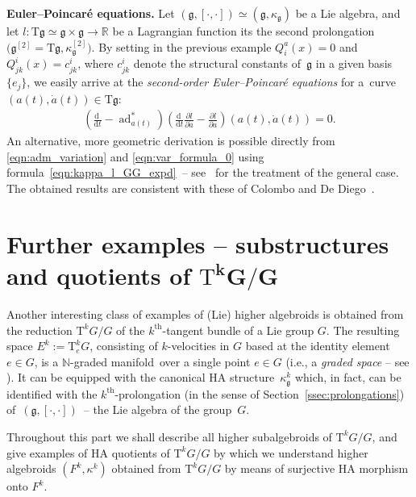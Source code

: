 \documentclass[10pt,a4paper]{amsart}
\newcommand{\grB}{{$\N$-graded manifold}}
\newcommand{\thh}[1]{#1^{\mathrm{th}}} %
\newcommand{\R}{\mathbb{R}}
\newcommand{\N}{\mathbb{N}}
\newcommand{\pa}{\partial}
\newcommand{\dd}{\mathrm{d}}
\newcommand{\ra}{\rightarrow}
\newcommand{\T}{\mathrm{T}} %
\newcommand{\TT}[1]{\mathrm{T}^{#1}} %
\newcommand{\g}{\mathfrak{g}} %
\numberwithin{equation}{section}
\theoremstyle{definition}
\begin{document}
{\bf Euler--Poincar\'{e} equations.} Let $(\g,[\cdot,\cdot])\simeq(\g,\kappa_{\g})$ be a Lie algebra, and let $l\colon \T\g\simeq \g\times\g\ra \R$ be a Lagrangian function its the second prolongation $\big(\g^{[2]}=\T\g,\kappa_{\g}^{[2]}\big)$. By setting in the previous example $Q^a_i(x)=0$ and $Q^i_{jk}(x)=c^i_{jk}$, where $c^i_{jk}$ denote the structural constants of~$\g$ in a given basis~$\{e_j\}$, we easily arrive at the \emph{second-order Euler--Poincar\'{e} equations} for a~curve $(a(t),\dot a(t))\in \T\g$:
\begin{gather}\label{eqn:EP}
\left(\frac{\dd\ }{\dd t}-\operatorname{ad}^\ast_{a(t)}\right)\left(\frac{\dd \ }{\dd t}\frac{\pa l}{\pa \dot a}-\frac{\pa l}{\pa a}\right)(a(t),\dot a(t))=0.
\end{gather}
An alternative, more geometric derivation is possible directly from \eqref{eqn:adm_variation} and \eqref{eqn:var_formula_0} using formula~\eqref{eqn:kappa_l_GG_expd}~-- see~\cite{MJ_MR_prototypes} for the treatment of the general case. The obtained results are consistent with these of Colombo and De Diego~\cite{Colombo_Diego_2014}.

\section[Further examples -- substructures and quotients of $\TT{k} G/G$]{Further examples -- substructures and quotients of $\boldsymbol{\TT{k} G/G}$}\label{sec:examples}

Another interesting class of examples of (Lie) higher algebroids is obtained from the reduction $\TT{k} G / G$ of the $\thh{k}$-tangent bundle of a Lie group $G$. The resulting space $E^k := \TT{k}_e G$, consisting of $k$-velocities in $G$ based at the identity element $e\in G$, is a \grB\ over a single point $e\in G$ (i.e., a \emph{graded space} -- see \cite{JG_MR_gr_bund_hgm_str_2011}). It can be equipped with the canonical HA structure~$\kappa^k_\g$ which, in fact, can be identified with the $\thh{k}$-prolongation (in the sense of Section~\ref{ssec:prolongations}) of~$(\g,[\cdot,\cdot])$~-- the Lie algebra of the group~$G$.

Throughout this part we shall describe all higher subalgebroids of $\TT{k} G / G$, and give examples of HA quotients of $\TT{k} G / G$ by which we understand higher algebroids $(F^k, \kappa^k)$ obtained from $\TT{k} G / G$ by means of surjective HA morphism onto $F^k$.
\end{document}
